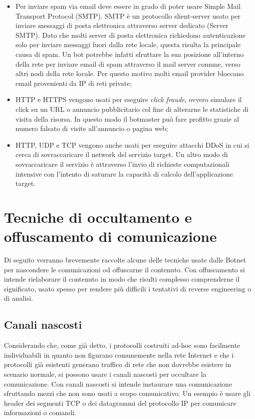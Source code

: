 \begin{itemize}
    \item Per inviare spam via email deve essere in grado di poter usare  Simple Mail Transport Protocol (SMTP). SMTP è un protocollo slient-server usato per inviare messaggi di posta elettronica attraverso server dedicato (Server SMTP). Dato che molti server di posta elettronica richiedono autenticazione solo per inviare messaggi fuori dalla rete locale, questa risulta la principale causa di spam. Un bot potrebbe infatti sfruttare la sua posizione all'interno della rete per inviare email di spam attraverso il mail server comune, verso altri nodi della rete locale. Per questo motivo molti email provider bloccano email provenienti da IP di reti private;
    \item HTTP e HTTPS vengono usati per eseguire \textit{click fraude}, ovvero simulare il click su un URL o  annuncio pubblicitario col fine di alterarne le statistiche di visita della risorsa. In questo modo il botmaster può fare profitto grazie al numero falsato di visite all'annuncio o pagina web;
    \item HTTP, UDP e TCP vengono anche usati per eseguire attacchi DDoS in cui si cerca di sovraccaricare il network del servizio target. Un altro modo di sovraccaricare il servizio è attraverso l'invio di richieste computazionali intensive con l'intento di saturare la capacità di calcolo dell'applicazione target.
\end{itemize}


\section{Tecniche di occultamento e offuscamento di comunicazione}
\label{TecnicheOccultamento}
Di seguito verranno brevemente raccolte alcune delle tecniche usate dalle Botnet per nascondere le comunicazioni od offuscarne il contenuto. Con offuscamento si intende rielaborare il contenuto in modo che risulti complesso comprenderne il significato, usato spesso per rendere più difficili i tentativi di reverse engineering o di analisi.

\subsection*{Canali nascosti}
 Considerando che, come  già detto, i protocolli costruiti ad-hoc sono facilmente individuabili in quanto non figurano comunemente nella rete Internet e che i protocolli già esistenti generano traffico di rete che non dovrebbe esistere in scenario normale,  si possono usare i canali nascosti per occultare la comunicazione.
  Con canali nascosti si intende instaurare una comunicazione sfruttando mezzi che non sono usati a scopo comunicativo. Un esempio è usare gli header dei segmenti TCP o dei datagrammi del protocollo IP per comunicare informazioni o comandi. 

